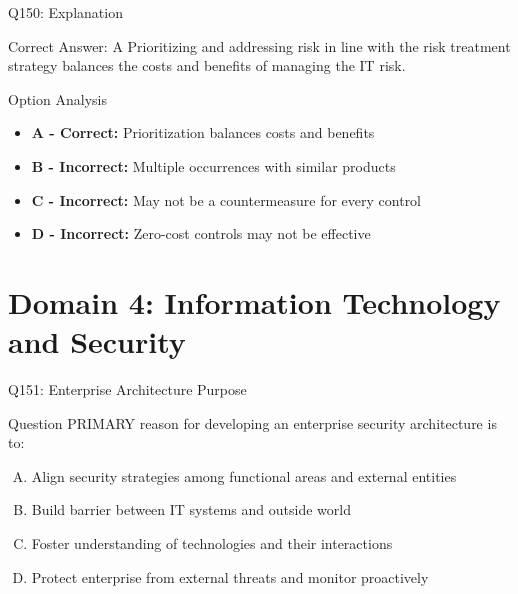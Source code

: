 \documentclass{beamer}
\begin{document}
	\begin{frame}{Q150: Explanation}
		\begin{block}{Correct Answer: A}
			Prioritizing and addressing risk in line with the risk treatment strategy balances the costs and benefits of managing the IT risk.
		\end{block}
		\begin{block}{Option Analysis}
			\begin{itemize}
				\item \textbf{A - Correct:} Prioritization balances costs and benefits
				\item \textbf{B - Incorrect:} Multiple occurrences with similar products
				\item \textbf{C - Incorrect:} May not be a countermeasure for every control
				\item \textbf{D - Incorrect:} Zero-cost controls may not be effective
			\end{itemize}
		\end{block}
	\end{frame}
	
	
	\section{Domain 4: Information Technology and Security}
	
	\begin{frame}{Q151: Enterprise Architecture Purpose}
		\begin{block}{Question}
			PRIMARY reason for developing an enterprise security architecture is to:
		\end{block}
		\begin{enumerate}[(A)]
			\item Align security strategies among functional areas and external entities
			\item Build barrier between IT systems and outside world
			\item Foster understanding of technologies and their interactions
			\item Protect enterprise from external threats and monitor proactively
		\end{enumerate}
	\end{frame}
	
\end{document}
